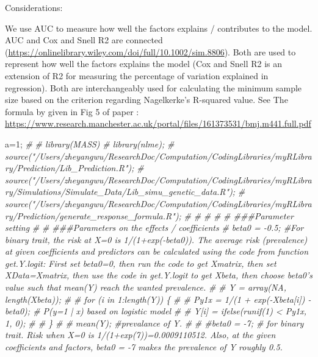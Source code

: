 \documentclass[]{article}
\newenvironment{Shaded}{\begin{snugshade}}{\end{snugshade}}
\newcommand{\CommentTok}[1]{\textcolor[rgb]{0.56,0.35,0.01}{\textit{#1}}}
\newcommand{\DecValTok}[1]{\textcolor[rgb]{0.00,0.00,0.81}{#1}}
\newcommand{\NormalTok}[1]{#1}
\begin{document}
Considerations:

We use AUC to measure how well the factors explains / contributes to the
model. AUC and Cox and Snell R2 are connected
(\url{https://onlinelibrary.wiley.com/doi/full/10.1002/sim.8806}). Both
are used to represent how well the factors explains the model (Cox and
Snell R2 is an extension of R2 for measuring the percentage of variation
explained in regression). Both are interchangeably used for calculating
the minimum sample size based on the criterion regarding Nagelkerke's
R-squared value. See The formula by given in Fig 5 of paper
\cite{riley2020calculating}:
\url{https://www.research.manchester.ac.uk/portal/files/161373531/bmj.m441.full.pdf}

\begin{Shaded}
\begin{Highlighting}[]
\NormalTok{a=}\DecValTok{1}\NormalTok{;}
\CommentTok{#  }
\CommentTok{#   library(MASS)}
\CommentTok{#   library(nlme);}
\CommentTok{#   source("/Users/zheyangwu/ResearchDoc/Computation/CodingLibraries/myRLibrary/Prediction/Lib_Prediction.R");  }
\CommentTok{#   source("/Users/zheyangwu/ResearchDoc/Computation/CodingLibraries/myRLibrary/Simulations/Simulate_Data/Lib_simu_genetic_data.R"); }
\CommentTok{#   source("/Users/zheyangwu/ResearchDoc/Computation/CodingLibraries/myRLibrary/Prediction/generate_response_formula.R");   }
\CommentTok{# }
\CommentTok{# }
\CommentTok{# }
\CommentTok{# }
\CommentTok{# ###Parameter setting}
\CommentTok{# }
\CommentTok{#   ###Parameters on the effects / coefficients}
\CommentTok{#   beta0 = -0.5; #For binary trait, the risk at X=0 is 1/(1+exp(-beta0)). The average risk (prevalence) at given coefficients and predictors can be calculated using the code from function get.Y.logit: First set beta0=0, then run the code to get Xmatrix, then set XData=Xmatrix, then use the code in get.Y.logit to get Xbeta, then choose beta0's value such that mean(Y) reach the wanted prevalence. }
\CommentTok{#                      # Y = array(NA, length(Xbeta));}
\CommentTok{#                      #  for (i in 1:length(Y)) \{}
\CommentTok{#                      #    Py1x = 1/(1 + exp(-Xbeta[i]) - beta0); # P(y=1 | x) based on logistic model}
\CommentTok{#                      #    Y[i] = ifelse(runif(1) < Py1x, 1, 0);}
\CommentTok{#                      #  \}}
\CommentTok{#                      #  mean(Y); #prevalance of Y.}
\CommentTok{#  }
\CommentTok{#   #beta0 = -7; # for binary trait. Risk when X=0 is 1/(1+exp(7))=0.0009110512. Also, at the given coefficients and factors, beta0 = -7 makes the prevalence of Y roughly 0.5. }

\end{Highlighting}
\end{Shaded}
\end{document}
